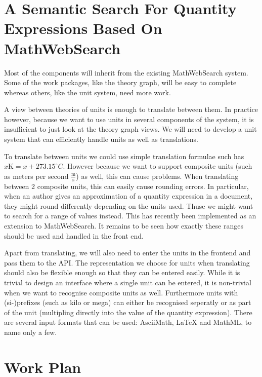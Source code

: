 \documentclass[11pt]{article}
\begin{document}
\section{A Semantic Search For Quantity Expressions Based On MathWebSearch}
\label{sec:system}

Most of the components will inherit from the existing MathWebSearch system. Some of the work packages, like the theory graph, will be easy to complete whereas others, like the unit system, need more work.

A view between theories of units is enough to translate between them. In practice however, because we want to use units in several components of the system, it is insufficient to just look at the theory graph views. We will need to develop a unit system that can efficiently handle units as well as translations.

To translate between units we could use simple translation formulae such has $x \text{K} = x + 273.15 ^\circ{C} $. However because we want to support composite units (such as meters per second $\frac{\text{m}}{\text{s}}$) as well, this can cause problems. When translating between 2 composite units, this can easily cause rounding errors. In particular, when an author gives an approximation of a quantity expression in a document, they might round differently depending on the units used. Thuse we might want to search for a range of values instead. This has recently been implemented as an extension to MathWebSearch\cite{MWS:Ranges}. It remains to be seen how exactly these ranges should be used and handled in the front end.

Apart from translating, we will also need to enter the units in the frontend and pass them to the API. The representation we choose for units when translating should also be flexible enough so that they can be entered easily. While it is trivial to design an interface where a single unit can be entered, it is non-trivial when we want to recognise composite units as well. Furthermore units with (si-)prefixes (such as kilo or mega) can either be recognised seperatly or as part of the unit (multipling directly into the value of the quantity expression). There are several input formats that can be used: AsciiMath, \LaTeX{} and MathML, to name only a few.

\section{Work Plan}
\label{sec:timings}
\end{document}
